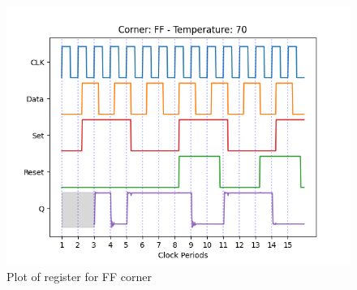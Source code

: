 \begin{figure}[H]
    \centering
    \begin{minipage}{0.5\textwidth}
        \centering
        \includegraphics[width=\textwidth]{Figures/Aimspice_Plots/FF_70.png}
        \caption{Plot of register for FF corner}
        \label{fig:FF70}
    \end{minipage}%
\end{figure}
